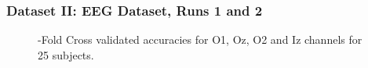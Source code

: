 \documentclass[aspectratio=169]{beamer}
\begin{document}
    \begin{frame}
    \frametitle{Dataset II: EEG Dataset, Runs 1 and 2 }
   \begin{figure}[thpb]
      \centering
      \setlength\fboxsep{0pt}
	  \setlength\fboxrule{0.5pt}
      \caption{-Fold Cross validated accuracies for O1, Oz, O2 and Iz channels for 25 subjects.}
      \label{figure2}
   \end{figure}          
    \end{frame}            
        
    
\end{document}
